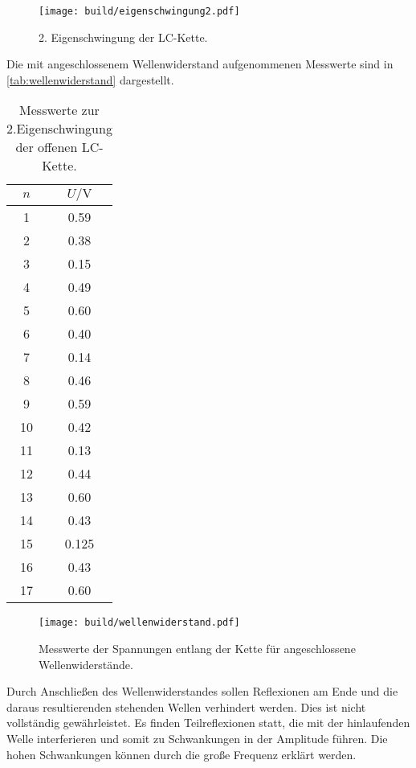 \begin{figure}
  \centering
  \texttt{[image: build/eigenschwingung2.pdf]}
\caption{2. Eigenschwingung der LC-Kette.}
  \label{fig:eigenschwingung2}
\end{figure}

Die mit angeschlossenem Wellenwiderstand aufgenommenen Messwerte sind in \ref{tab:wellenwiderstand} dargestellt.
\begin{table}
  \centering
  \caption{Messwerte zur 2.Eigenschwingung der offenen LC-Kette.}
  \label{tab:eigenschwingung2}
  \begin{tabular}{c c}
    \toprule
    $n$ & $U / \si{\volt}$\\
    \midrule
1 & 0.59 \\
2 & 0.38 \\
3 & 0.15 \\
4 & 0.49 \\
5 & 0.60 \\
6 & 0.40 \\
7 & 0.14 \\
8 & 0.46 \\
9 & 0.59 \\
10 & 0.42 \\
11 & 0.13 \\
12 & 0.44 \\
13 & 0.60 \\
14 & 0.43 \\
15 & 0.125 \\
16 & 0.43 \\
17 & 0.60 \\
\bottomrule
\end{tabular}
\end{table}

\begin{figure}
  \centering
  \texttt{[image: build/wellenwiderstand.pdf]}
\caption{Messwerte der Spannungen entlang der Kette für angeschlossene Wellenwiderstände.}
  \label{fig:wellenwiderstand}
\end{figure}

Durch Anschließen des Wellenwiderstandes sollen Reflexionen am Ende und die daraus resultierenden stehenden Wellen verhindert werden. Dies ist nicht vollständig gewährleistet. Es finden Teilreflexionen statt, die mit der hinlaufenden Welle interferieren und somit zu Schwankungen in der Amplitude führen. Die hohen Schwankungen können durch die große Frequenz erklärt werden.
